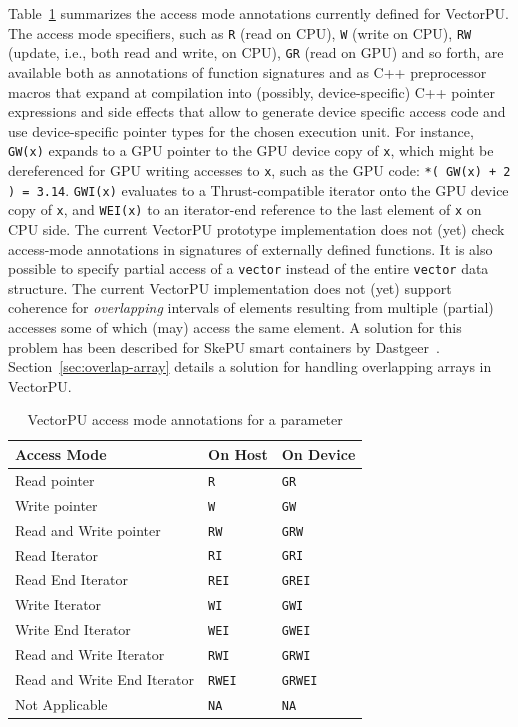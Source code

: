 Table~\ref{tab:modes} summarizes the access mode annotations
currently defined for VectorPU. The access mode specifiers,
such as \texttt{R} (read on CPU), \texttt{W} (write on CPU), \texttt{RW} 
(update, i.e., both read and write, on CPU), \texttt{GR} (read on GPU) and so forth,
are available both as annotations of function signatures and
as C++ preprocessor macros that expand at compilation into (possibly, device-specific) C++ pointer
expressions and side effects that allow to generate device specific access code
and use device-specific pointer types for the chosen execution unit. 
For instance, \texttt{GW(x)} expands to a GPU pointer to
the GPU device copy of \texttt{x},
which might be dereferenced for GPU writing accesses to \texttt{x},
such as the GPU code: \verb:*( GW(x) + 2 ) = 3.14:.
\texttt{GWI(x)} evaluates to a Thrust-compatible iterator onto the 
GPU device copy of \texttt{x}, and \texttt{WEI(x)} to an iterator-end reference
to the last element of \texttt{x} on CPU side. The current VectorPU prototype implementation does not
(yet) check access-mode annotations in signatures of externally defined functions.
%
It is also possible to specify partial access of a \verb:vector:
instead of the
entire \verb.vector. data structure. The current
VectorPU implementation does not (yet) support coherence for 
\emph{overlapping}
intervals of elements resulting from multiple (partial) accesses
some of which (may) access the same element.
A solution for this problem has been described for SkePU
smart containers by Dastgeer~\cite{Dastgeer-IJPP15}. Section~\ref{sec:overlap-array} details a solution for handling overlapping arrays in VectorPU.
%


\begin{table}
\caption{\label{tab:modes}VectorPU access mode annotations for a parameter  \cite{VectorPU-2017}}

\begin{center}
\begin{tabular}{|lll|}
\hline
Access Mode & On Host & On Device \\
\hline
Read pointer & \texttt{R} & \texttt{GR} \\
Write pointer & \texttt{W} & \texttt{GW} \\
Read and Write pointer & \texttt{RW} & \texttt{GRW} \\
Read Iterator & \texttt{RI} & \texttt{GRI} \\
Read End Iterator & \texttt{REI} & \texttt{GREI}\\
Write Iterator & \texttt{WI} & \texttt{GWI}\\
Write End Iterator & \texttt{WEI} & \texttt{GWEI}\\
Read and Write Iterator & \texttt{RWI} & \texttt{GRWI}\\
Read and Write End Iterator & \texttt{RWEI} & \texttt{GRWEI}\\
Not Applicable & \texttt{NA} & \texttt{NA} \\
\hline
\end{tabular}
\vspace{-3ex}
\end{center}
\end{table}


